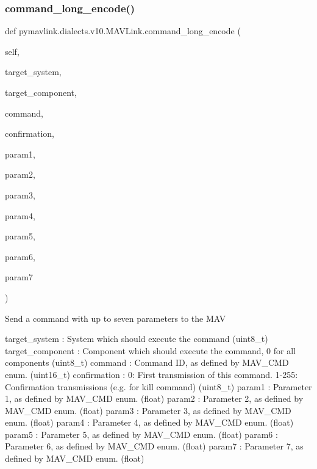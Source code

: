 \begin{DoxyVerb}
\begin{DoxyVerb}
\subsubsection{\texorpdfstring{command\+\_\+long\+\_\+encode()}{command\_long\_encode()}}
{\footnotesize\ttfamily def pymavlink.\+dialects.\+v10.\+M\+A\+V\+Link.\+command\+\_\+long\+\_\+encode (\begin{DoxyParamCaption}\item[{}]{self,  }\item[{}]{target\+\_\+system,  }\item[{}]{target\+\_\+component,  }\item[{}]{command,  }\item[{}]{confirmation,  }\item[{}]{param1,  }\item[{}]{param2,  }\item[{}]{param3,  }\item[{}]{param4,  }\item[{}]{param5,  }\item[{}]{param6,  }\item[{}]{param7 }\end{DoxyParamCaption})}

\begin{DoxyVerb}Send a command with up to seven parameters to the MAV

target_system             : System which should execute the command (uint8_t)
target_component          : Component which should execute the command, 0 for all components (uint8_t)
command                   : Command ID, as defined by MAV_CMD enum. (uint16_t)
confirmation              : 0: First transmission of this command. 1-255: Confirmation transmissions (e.g. for kill command) (uint8_t)
param1                    : Parameter 1, as defined by MAV_CMD enum. (float)
param2                    : Parameter 2, as defined by MAV_CMD enum. (float)
param3                    : Parameter 3, as defined by MAV_CMD enum. (float)
param4                    : Parameter 4, as defined by MAV_CMD enum. (float)
param5                    : Parameter 5, as defined by MAV_CMD enum. (float)
param6                    : Parameter 6, as defined by MAV_CMD enum. (float)
param7                    : Parameter 7, as defined by MAV_CMD enum. (float)\end{DoxyVerb}
 \mbox{\label{classpymavlink_1_1dialects_1_1v10_1_1MAVLink_a066f3a1ddcb8ba075a03635690b8d2c1}} 

\end{DoxyVerb}
\end{DoxyVerb}
